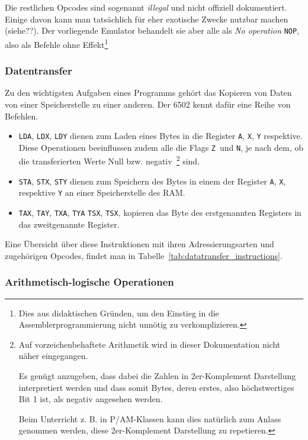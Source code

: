 \documentclass[11pt]{scrartcl}
\newcommand{\nflag}{\texttt{N}}
\newcommand{\zflag}{\texttt{Z}}
\begin{document}
Die restlichen Opcodes sind sogenannt \emph{illegal} und nicht
offiziell dokumentiert. Einige davon kann man tatsächlich für eher
exotische Zwecke nutzbar machen (siehe??). Der vorliegende Emulator
behandelt sie aber alle als \emph{No operation} \texttt{NOP}, also als
Befehle ohne Effekt\footnote{Dies aus didaktischen Gründen, um den
  Einstieg in die Assemblerprogrammierung nicht unnötig zu
  verkomplizieren.}

\subsubsection{Datentransfer}
\label{sec:datatransfer_instructions}
Zu den wichtigsten Aufgaben eines Programms gehört das Kopieren von
Daten von einer Speicherstelle zu einer anderen. Der 6502 kennt dafür
eine Reihe von Befehlen.

\begin{itemize}
\item \texttt{LDA}, \texttt{LDX}, \texttt{LDY} dienen zum Laden eines
  Bytes in die Register \texttt{A}, \texttt{X}, \texttt{Y} respektive.
  Diese Operationen beeinflussen zudem alle die Flags \zflag\ und \nflag,
  je nach dem, ob die transferierten Werte Null
  bzw. negativ~\footnote{Auf vorzeichenbehaftete Arithmetik wird in
    dieser Dokumentation nicht näher eingegangen.
    
    Es genügt anzugeben, dass dabei die Zahlen in 2er-Komplement
    Darstellung interpretiert werden und dass somit Bytes, deren erstes,
    also höchstwertiges Bit 1 ist, als negativ angesehen werden.
    
    Beim Unterricht z. B. in P/AM-Klassen kann dies natürlich zum Anlass
    genommen werden, diese 2er-Komplement Darstellung zu repetieren.}
  sind.
\item \texttt{STA}, \texttt{STX}, \texttt{STY} dienen zum Speichern
  des Bytes in einem der  Register \texttt{A}, \texttt{X}, respektive
  \texttt{Y} an einer Speicherstelle des RAM.
\item \texttt{TAX}, \texttt{TAY}, \texttt{TXA}, \texttt{TYA}
  \texttt{TSX}, \texttt{TSX}, kopieren das Byte des erstgenannten
  Registers in das zweitgenannte Register.
\end{itemize}



Eine Übersicht über diese Instruktionen mit ihren Adressierungsarten
und zugehörigen Opcodes, findet man in
Tabelle~\ref{tab:datatransfer_instructions}.


\subsubsection{Arithmetisch-logische Operationen}
\label{sec:arithmetic_logic}
\end{document}

